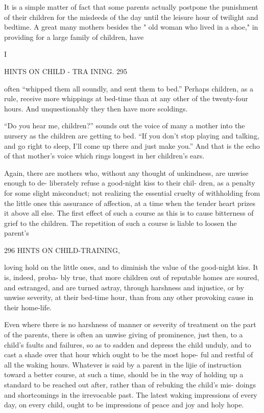 \documentclass[
]{book}
\begin{document}
It is a simple matter of fact that some parents actually postpone the punishment of their children for the misdeeds of the day until the leisure hour of twilight and bedtime. A great many mothers besides the " old woman who lived in a shoe," in providing for a large family of children, have

I

HINTS ON CHILD - TRA INING. 295

often ``whipped them all soundly, and sent them to bed.'' Perhaps children, as a rule, receive more whippings at bed-time than at any other of the twenty-four hours. And unquestionably they then have more scoldings.

``Do you hear me, children?'' sounds out the voice of many a mother into the nursery as the children are getting to bed. ``If you don't stop playing and talking, and go right to sleep, I'll come up there and just make you.'' And that is the echo of that mother's voice which rings longest in her children's ears.

Again, there are mothers who, without any thought of unkindness, are unwise enough to de- liberately refuse a good-night kiss to their chil- dren, as a penalty for some slight misconduct; not realizing the essential cruelty of withholding from the little ones this assurance of affection, at a time when the tender heart prizes it above all else. The first effect of such a course as this is to cause bitterness of grief to the children. The repetition of such a course is liable to loosen the parent's

296 HINTS ON CHILD-TRAINING,

loving hold on the little ones, and to diminish the value of the good-night kiss. It is, indeed, proba- bly true, that more children out of reputable homes are soured, and estranged, and are turned astray, through harshness and injustice, or by unwise severity, at their bed-time hour, than from any other provoking cause in their home-life.

Even where there is no harshness of manner or severity of treatment on the part of the parents, there is often an unwise giving of prominence, just then, to a child's faults and failures, so as to sadden and depress the child unduly, and to cast a shade over that hour which ought to be the most hope- ful and restful of all the waking hours. Whatever is said by a parent in the lijie of instruction toward a better course, at such a time, should be in the way of holding up a standard to be reached out after, rather than of rebuking the child's mis- doings and shortcomings in the irrevocable past. The latest waking impressions of every day, on every child, ought to be impressions of peace and joy and holy hope.
\end{document}
